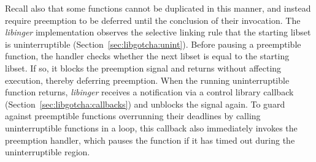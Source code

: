 Recall also that some functions cannot be duplicated in this manner, and instead
require preemption to be deferred until the conclusion of their invocation.  The
\textit{libinger} implementation observes the selective linking rule that the
starting libset is uninterruptible (Section~\ref{sec:libgotcha:unint}).  Before
pausing a preemptible function, the handler checks whether the next libset is equal
to the starting libset.  If so, it blocks the preemption signal and returns without
affecting execution, thereby deferring preemption.  When the running uninterruptible
function returns, \textit{libinger} receives a notification via a control library
callback (Section~\ref{sec:libgotcha:callbacks}) and unblocks the signal again.  To
guard against preemptible functions overrunning their deadlines by calling
uninterruptible functions in a loop, this callback also immediately invokes the
preemption handler, which pauses the function if it has timed out during the
uninterruptible region.

